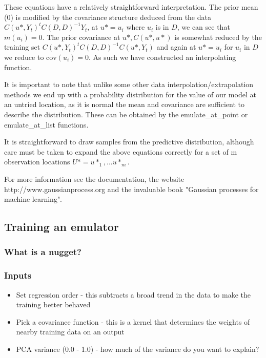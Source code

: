 \documentclass{article}
\begin{document}
These equations have a relatively straightforward interpretation. The
prior mean (0) is modified by the covariance structure deduced from
the data $C(u*,Y_t)^t C(D,D)^{-1} Y_t$, at $u* = u_i$ where $u_i$ is in $D$,
we can see that $m(u_i) = 0$. The prior covariance at $u*, C(u*,u*)$ is
somewhat reduced by the training set $C(u*,Y_t)^t C(D,D)^{-1}
C(u*,Y_t)$ and again at $u*=u_i$ for $u_i$ in $D$ we reduce to $\textrm{cov}(u_i) =
0$. As such we have constructed an interpolating function.

It is important to note that unlike some other data
interpolation/extrapolation methods we end up with a probability
distribution for the value of our model at an untried location, as it
is normal the mean and covariance are sufficient to describe the
distribution. These can be obtained by the emulate\_at\_point or
emulate\_at\_list functions.

It is straightforward to draw samples from the predictive
distribution, although care must be taken to expand the above
equations correctly for a set of m observation locations
$U* = {u*_1, ... u*_m}$.

For more information see the documentation, the website
http://www.gaussianprocess.org and the invaluable book "Gaussian
processes for machine learning".

\subsection{Training an emulator}

\subsubsection{What is a nugget?}

\subsubsection{Inputs}

\begin{itemize}

\item Set regression order - this subtracts a broad trend in the data to make the training better behaved

\item Pick a covariance function - this is a kernel that determines the weights of nearby training data on an output

\item PCA variance (0.0 - 1.0) - how much of the variance do you want to explain?

\end{itemize}
\end{document}
